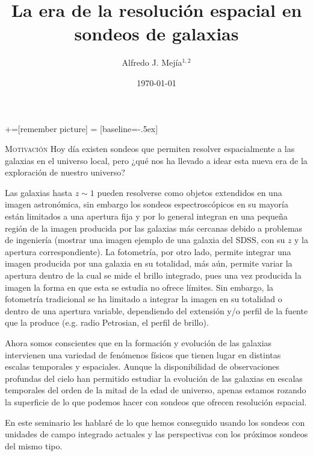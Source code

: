 \documentclass[xcolor=dvipsnames,4pt]{beamer}
\begin{document}
+=[remember picture]
 = [baseline=-.5ex]

\begin{frame}
\title{La era de la resolución espacial en sondeos de galaxias}
\author{Alfredo J. Mej\'ia$^{1,2}$}

\date{\today}


\maketitle
\end{frame}

\begin{frame}[allowframebreaks]{\textsc{Motivación}}
%
Hoy día existen sondeos que permiten resolver espacialmente a las galaxias en el universo local,
pero ¿qué nos ha llevado a idear esta nueva era de la exploración de nuestro universo?

Las galaxias hasta $z\sim1$ pueden resolverse como objetos extendidos en una imagen astronómica, sin
embargo los sondeos espectroscópicos en su mayoría están limitados a una apertura fija y por lo
general integran en una pequeña región de la imagen producida por las galaxias más cercanas debido a
problemas de ingeniería (mostrar una imagen ejemplo de una galaxia del SDSS, con su $z$ y la
apertura correspondiente). La fotometría, por otro lado, permite integrar una imagen producida por
una galaxia en su totalidad, más aún, permite variar la apertura dentro de la cual se mide el brillo
integrado, pues una vez producida la imagen la forma en que esta se estudia no ofrece límites. Sin
embargo, la fotometría tradicional se ha limitado a integrar la imagen en su totalidad o dentro de
una apertura variable, dependiendo del extensión y/o perfil de la fuente que la produce (e.g. radio
Petrosian, el perfil de brillo).

Ahora somos conscientes que en la formación y evolución de las galaxias intervienen una variedad de
fenómenos físicos que tienen lugar en distintas escalas temporales y espaciales. Aunque la
disponibilidad de observaciones profundas del cielo han permitido estudiar la evolución de las
galaxias en escalas temporales del orden de la mitad de la edad de universo, apenas estamos rozando
la superficie de lo que podemos hacer con sondeos que ofrecen resolución espacial.

En este seminario les hablaré de lo que hemos conseguido usando los sondeos con unidades de campo
integrado actuales y las perspectivas con los próximos sondeos del mismo tipo.
%
\end{frame}
\end{document}
